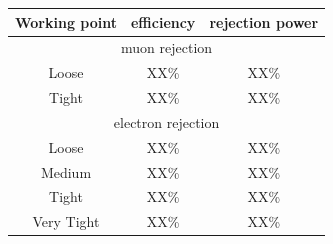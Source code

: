 \begin{table}
\begin{center}
\begin{tabular}{|c|c|c|}
 \toprule
 Working point & efficiency & rejection power \\
 \midrule
 \multicolumn{3}{|c|}{muon rejection} \\
 \hline
 Loose & XX\% & XX\% \\
 Tight   & XX\% & XX\% \\
 \hline
 \multicolumn{3}{|c|}{electron rejection} \\
 \hline
 Loose    & XX\% & XX\% \\
 Medium & XX\% & XX\% \\
 Tight     & XX\% & XX\% \\
 Very Tight & XX\% & XX\% \\
 \bottomrule
\end{tabular}
\end{center}
\label{tab:tau_lep_rej}
\end{table}
